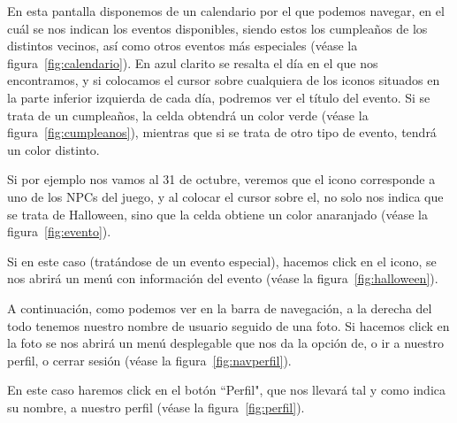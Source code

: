 
En esta pantalla disponemos de un calendario por el que podemos navegar, en el cuál se nos indican los eventos disponibles, siendo estos los cumpleaños de los distintos vecinos, así como otros eventos más especiales {(v\'ease la figura~\ref{fig:calendario})}. En azul clarito se resalta el día en el que nos encontramos, y si colocamos el cursor sobre cualquiera de los iconos situados en la parte inferior izquierda de cada día, podremos ver el título del evento. Si se trata de un cumpleaños, la celda obtendrá un color verde {(v\'ease la figura~\ref{fig:cumpleanos})}, mientras que si se trata de otro tipo de evento, tendrá un color distinto.\\


\clearpage

Si por ejemplo nos vamos al 31 de octubre, veremos que el icono corresponde a uno de los NPCs del juego, y al colocar el cursor sobre el, no solo nos indica que se trata de Halloween, sino que la celda obtiene un color anaranjado {(v\'ease la figura~\ref{fig:evento})}.\\


 Si en este caso (tratándose de un evento especial), hacemos click en el icono, se nos abrirá un menú con información del evento {(v\'ease la figura~\ref{fig:halloween})}.\\


\clearpage

A continuación, como podemos ver en la barra de navegación, a la derecha del todo tenemos nuestro nombre de usuario seguido de una foto. Si hacemos click en la foto se nos abrirá un menú desplegable que nos da la opción de, o ir a nuestro perfil, o cerrar sesión {(v\'ease la figura~\ref{fig:navperfil})}.\\


En este caso haremos click en el botón ``Perfil", que nos llevará tal y como indica su nombre, a nuestro perfil {(v\'ease la figura~\ref{fig:perfil})}.\\

